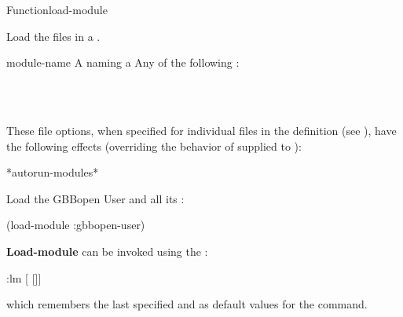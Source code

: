 \documentclass[10pt,twoside,english,pdftex]{article}
\begin{document}

\begin{functiondoc}{Function}{load-module}{%
    }
%
% 

\fnsyntax 

\fnpurpose Load the files in a .

\fnpackage {}

\fnmodule {}

\fnargs
\begin{args}{module-name}
 A  naming a 
\arg[option] Any of the following : 
\loadmoduleoptions
\end{args}

\fnerrors 
\modulenotdefined\\
\relativedircircularity\\
\patchesonlymodulenotloaded

\fndescription These file options, when specified for individual files in the
 definition (see ),
have the following effects (overriding the behavior of 
supplied to ):
%
\W\supp\tabletop
\loadmodulefileoptions

\begin{alsos}{*autorun-modules*}
\end{alsos}

\fnexample 
%
Load the GBBopen User  and all its :
%
\W\supp
\begin{example}
  (load-module :gbbopen-user)
\end{example}

\replnote \textbf{Load-module} can be invoked using the :
%
%
%
\W\supp
\begin{example}
  :lm \textrm{[} \textrm{[}\superstar\textrm{]]}
\end{example}
%
which remembers the last specified  and
 as default values for the command.

\end{functiondoc}
\end{document}
